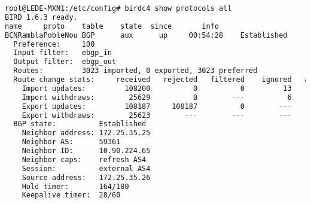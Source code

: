 \begin{lstlisting}[language=bash, label={lst:birdchr}, caption={Birdc Simple \texttt{Show Protocols all}. Truncated to show BGP.}]
root@LEDE-MXN1:/etc/config# birdc4 show protocols all
BIRD 1.6.3 ready.
name     proto    table    state  since       info
BCNRamblaPobleNou BGP      aux      up     00:54:28    Established
  Preference:     100
  Input filter:   ebgp_in
  Output filter:  ebgp_out
  Routes:         3023 imported, 0 exported, 3023 preferred
  Route change stats:     received   rejected   filtered    ignored   accepted
    Import updates:         108200          0          0         13     108187
    Import withdraws:        25629          0        ---          6      25623
    Export updates:         108187     108187          0        ---          0
    Export withdraws:        25623        ---        ---        ---          0
  BGP state:          Established
    Neighbor address: 172.25.35.25
    Neighbor AS:      59361
    Neighbor ID:      10.90.224.65
    Neighbor caps:    refresh AS4
    Session:          external AS4
    Source address:   172.25.35.26
    Hold timer:       164/180
    Keepalive timer:  28/60
\end{lstlisting}